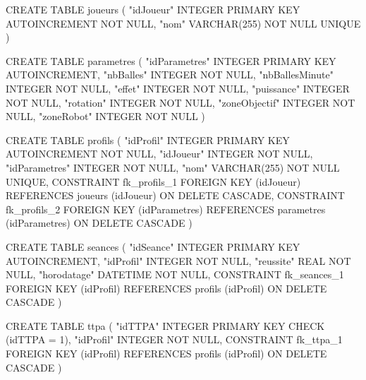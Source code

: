 \begin{DoxyCode}
CREATE TABLE joueurs ( "idJoueur" INTEGER PRIMARY KEY AUTOINCREMENT NOT NULL, "nom" VARCHAR(255) NOT NULL
       UNIQUE )

CREATE TABLE parametres ( "idParametres" INTEGER PRIMARY KEY AUTOINCREMENT, "nbBalles" INTEGER NOT NULL,
       "nbBallesMinute" INTEGER NOT NULL, "effet" INTEGER NOT NULL, "puissance" INTEGER NOT NULL, "rotation" INTEGER
       NOT NULL, "zoneObjectif" INTEGER NOT NULL, "zoneRobot" INTEGER NOT NULL )

CREATE TABLE profils ( "idProfil" INTEGER PRIMARY KEY AUTOINCREMENT NOT NULL, "idJoueur" INTEGER NOT NULL,
       "idParametres" INTEGER NOT NULL, "nom" VARCHAR(255) NOT NULL UNIQUE, CONSTRAINT fk\_profils\_1 FOREIGN KEY
       (idJoueur) REFERENCES joueurs (idJoueur) ON DELETE CASCADE, CONSTRAINT fk\_profils\_2 FOREIGN KEY (idParametres)
       REFERENCES parametres (idParametres) ON DELETE CASCADE )

CREATE TABLE seances ( "idSeance" INTEGER PRIMARY KEY AUTOINCREMENT, "idProfil" INTEGER NOT NULL,
       "reussite" REAL NOT NULL, "horodatage" DATETIME NOT NULL, CONSTRAINT fk\_seances\_1 FOREIGN KEY (idProfil) REFERENCES
       profils (idProfil) ON DELETE CASCADE )

CREATE TABLE ttpa ( "idTTPA" INTEGER PRIMARY KEY CHECK (idTTPA = 1), "idProfil" INTEGER NOT NULL,
       CONSTRAINT fk\_ttpa\_1 FOREIGN KEY (idProfil) REFERENCES profils (idProfil) ON DELETE CASCADE )
\end{DoxyCode}
 
